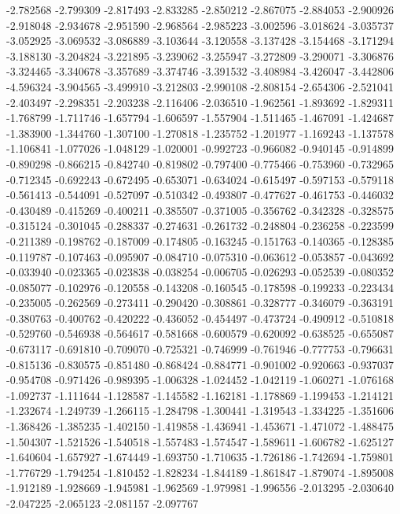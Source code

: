 -2.782568
-2.799309
-2.817493
-2.833285
-2.850212
-2.867075
-2.884053
-2.900926
-2.918048
-2.934678
-2.951590
-2.968564
-2.985223
-3.002596
-3.018624
-3.035737
-3.052925
-3.069532
-3.086889
-3.103644
-3.120558
-3.137428
-3.154468
-3.171294
-3.188130
-3.204824
-3.221895
-3.239062
-3.255947
-3.272809
-3.290071
-3.306876
-3.324465
-3.340678
-3.357689
-3.374746
-3.391532
-3.408984
-3.426047
-3.442806
-4.596324
-3.904565
-3.499910
-3.212803
-2.990108
-2.808154
-2.654306
-2.521041
-2.403497
-2.298351
-2.203238
-2.116406
-2.036510
-1.962561
-1.893692
-1.829311
-1.768799
-1.711746
-1.657794
-1.606597
-1.557904
-1.511465
-1.467091
-1.424687
-1.383900
-1.344760
-1.307100
-1.270818
-1.235752
-1.201977
-1.169243
-1.137578
-1.106841
-1.077026
-1.048129
-1.020001
-0.992723
-0.966082
-0.940145
-0.914899
-0.890298
-0.866215
-0.842740
-0.819802
-0.797400
-0.775466
-0.753960
-0.732965
-0.712345
-0.692243
-0.672495
-0.653071
-0.634024
-0.615497
-0.597153
-0.579118
-0.561413
-0.544091
-0.527097
-0.510342
-0.493807
-0.477627
-0.461753
-0.446032
-0.430489
-0.415269
-0.400211
-0.385507
-0.371005
-0.356762
-0.342328
-0.328575
-0.315124
-0.301045
-0.288337
-0.274631
-0.261732
-0.248804
-0.236258
-0.223599
-0.211389
-0.198762
-0.187009
-0.174805
-0.163245
-0.151763
-0.140365
-0.128385
-0.119787
-0.107463
-0.095907
-0.084710
-0.075310
-0.063612
-0.053857
-0.043692
-0.033940
-0.023365
-0.023838
-0.038254
-0.006705
-0.026293
-0.052539
-0.080352
-0.085077
-0.102976
-0.120558
-0.143208
-0.160545
-0.178598
-0.199233
-0.223434
-0.235005
-0.262569
-0.273411
-0.290420
-0.308861
-0.328777
-0.346079
-0.363191
-0.380763
-0.400762
-0.420222
-0.436052
-0.454497
-0.473724
-0.490912
-0.510818
-0.529760
-0.546938
-0.564617
-0.581668
-0.600579
-0.620092
-0.638525
-0.655087
-0.673117
-0.691810
-0.709070
-0.725321
-0.746999
-0.761946
-0.777753
-0.796631
-0.815136
-0.830575
-0.851480
-0.868424
-0.884771
-0.901002
-0.920663
-0.937037
-0.954708
-0.971426
-0.989395
-1.006328
-1.024452
-1.042119
-1.060271
-1.076168
-1.092737
-1.111644
-1.128587
-1.145582
-1.162181
-1.178869
-1.199453
-1.214121
-1.232674
-1.249739
-1.266115
-1.284798
-1.300441
-1.319543
-1.334225
-1.351606
-1.368426
-1.385235
-1.402150
-1.419858
-1.436941
-1.453671
-1.471072
-1.488475
-1.504307
-1.521526
-1.540518
-1.557483
-1.574547
-1.589611
-1.606782
-1.625127
-1.640604
-1.657927
-1.674449
-1.693750
-1.710635
-1.726186
-1.742694
-1.759801
-1.776729
-1.794254
-1.810452
-1.828234
-1.844189
-1.861847
-1.879074
-1.895008
-1.912189
-1.928669
-1.945981
-1.962569
-1.979981
-1.996556
-2.013295
-2.030640
-2.047225
-2.065123
-2.081157
-2.097767
